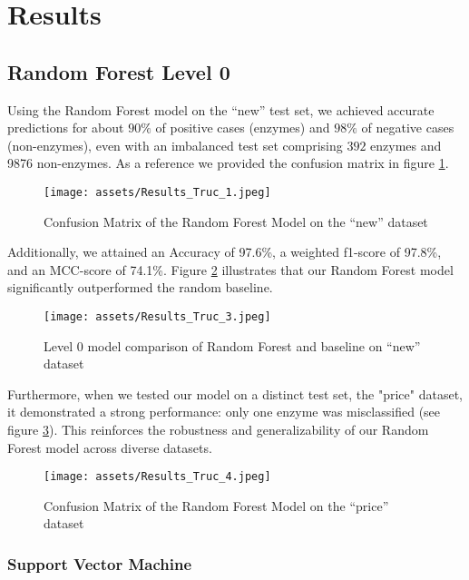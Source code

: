 \documentclass{bioinfo}
\begin{document}
\section{Results}	

\subsection{Random Forest Level 0}
Using the Random Forest model on the “new” test set, we achieved accurate predictions for about 
$90\%$ of positive cases (enzymes) and $98\%$ of negative cases (non-enzymes), even with an imbalanced test set comprising 
$392$ enzymes and 9876 non-enzymes. As a reference we provided the confusion matrix in figure \ref{fig:RF_conf_l0}.

\begin{figure}[!htpb]
\texttt{[image: assets/Results\_Truc\_1.jpeg]}
\caption{Confusion Matrix of the Random Forest Model on the “new” dataset}\label{fig:RF_conf_l0}
\end{figure}

Additionally, we attained an Accuracy of 97.6\%, a weighted f1-score of 97.8\%, and an MCC-score of 74.1\%. 
Figure \ref{fig:RF_scores_l0} illustrates that our Random Forest model significantly outperformed the random baseline.

\begin{figure}[!htpb]
\texttt{[image: assets/Results\_Truc\_3.jpeg]}
\caption{Level 0 model comparison of Random Forest and baseline on “new” dataset}\label{fig:RF_scores_l0}
\end{figure}

Furthermore, when we tested our model on a distinct test set, the "price" dataset,
it demonstrated a strong performance: only one enzyme was misclassified  (see figure \ref{fig:RF_conf_l0_price}).
This reinforces the robustness and generalizability of our Random Forest model across diverse datasets.

\begin{figure}[!htpb]
\texttt{[image: assets/Results\_Truc\_4.jpeg]}
\caption{Confusion Matrix of the Random Forest Model on the “price” dataset}\label{fig:RF_conf_l0_price}
\end{figure}


\subsubsection{Support Vector Machine}
\end{document}
